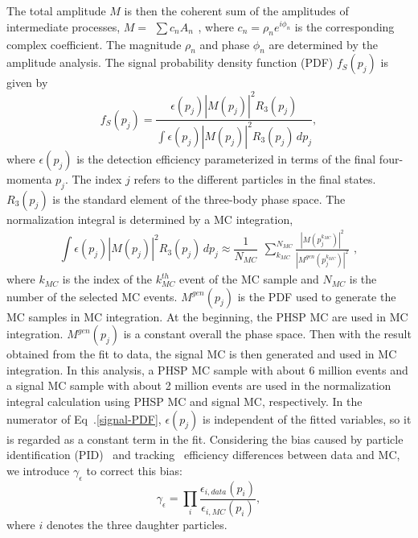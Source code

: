 {The total amplitude $M$ is then the coherent sum of the amplitudes of intermediate processes, $M=\begin{matrix}\sum c_{n}A_{n}\end{matrix}$, where $c_{n}=\rho_{n}e^{i\phi_{n}}$ is the corresponding complex coefficient. The magnitude $\rho_{n}$ and phase $\phi_{n}$ are determined by the amplitude analysis. 
    The signal probability density function (PDF) $f_{S}(p_{j})$ is given by 
    \begin{equation}
        f_{S}(p_{j}) = \frac{\epsilon(p_{j})\left|M(p_{j})\right|^{2}R_{3}(p_{j})}{\int \epsilon(p_{j})\left|M(p_{j})\right|^{2}R_{3}(p_{j})\,dp_{j}}, \label{signal-PDF}
    \end{equation}
    where $\epsilon(p_{j})$ is the detection efficiency parameterized in terms of the final four-momenta $p_{j}$. The index $j$ refers to the different particles in the final states. 
    $R_{3}(p_{j})$ is the standard element of the three-body phase space. 
    The normalization integral is determined by a MC integration,
    \begin{equation}
    \int \epsilon(p_{j})\left|M(p_{j})\right|^{2}R_{3}(p_{j})\,dp_{j} \approx \frac{1}{N_{MC}} \begin{matrix}\sum_{k_{MC}}^{N_{MC}} \frac{\left|M(p_{j}^{k_{MC}})\right|^{2}}{\left|M^{gen}(p_{j}^{k_{MC}})\right|^{2}}\end{matrix}, \label{MC-intergral}
    \end{equation}
    where $k_{MC}$ is the index of the $k_{MC}^{th}$ event of the MC sample and $N_{MC}$ is the number of the selected MC events.  
    $M^{gen}(p_{j})$ is the PDF used to generate the MC samples in MC integration.
    At the beginning, the PHSP MC are used in MC integration. $M^{gen}(p_{j})$ is a constant overall the phase space.
    Then with the result obtained from the fit to data, the signal MC is then generated and used in MC integration.
    In this analysis, a PHSP MC sample with about 6 million events and  a signal MC sample with about 2 million events are used in the normalization integral calculation using PHSP MC and signal MC, respectively.
    In the numerator of Eq~.\ref{signal-PDF}, $\epsilon(p_{j})$ is independent of the fitted variables, so it is regarded as a constant term in the fit.
    Considering the bias caused by particle identification (PID)~\cite{PID} and tracking~\cite{Tracking} efficiency differences between data and MC, we introduce $\gamma_{\epsilon}$ to correct this bias:
    \begin{equation}
        \gamma_{\epsilon} = \prod_{i} \frac{\epsilon_{i, data}(p_{i})}{\epsilon_{i, MC}(p_{i})}, \label{experimental-effect}
    \end{equation}
    where $i$ denotes the three daughter particles. 

}
